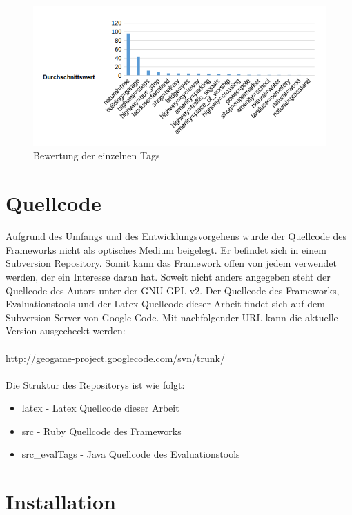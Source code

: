 \begin{figure}[H]
\begin{center}
\includegraphics[width=150mm]{images/ch8_valued3.png}
\caption{Bewertung der einzelnen Tags}
\label{img:ch8_valued3}
\end{center}
\end{figure}

\newpage

\section{Quellcode}

Aufgrund des Umfangs und des Entwicklungsvorgehens wurde der Quellcode des Frameworks nicht als optisches Medium beigelegt. Er befindet sich in einem Subversion Repository.
Somit kann das Framework offen von jedem verwendet werden, der ein Interesse daran hat. Soweit nicht anders angegeben steht der Quellcode des Autors unter der GNU GPL v2.
Der Quellcode des Frameworks, Evaluationstools und der Latex Quellcode dieser Arbeit findet sich auf dem Subversion Server von Google Code.
Mit nachfolgender URL kann die aktuelle Version ausgecheckt werden:\\\\
\url{http://geogame-project.googlecode.com/svn/trunk/}\\\\

Die Struktur des Repositorys ist wie folgt:
\begin{itemize}
\item latex - Latex Quellcode dieser Arbeit
\item src - Ruby Quellcode des Frameworks
\item src\_evalTags - Java Quellcode des Evaluationstools
\end{itemize}

\section{Installation}

